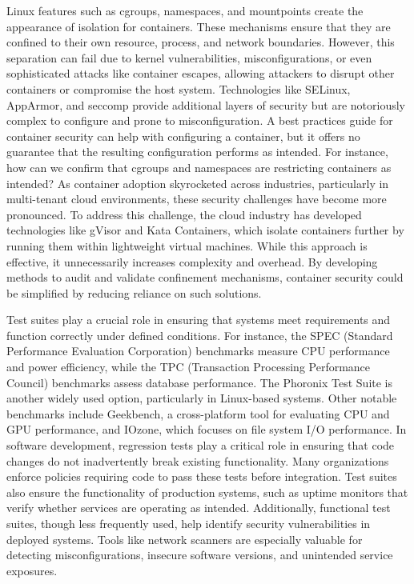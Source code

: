 Linux features such as cgroups, namespaces, and mountpoints create the appearance of isolation for containers. These mechanisms ensure that they are confined to their own resource, process, and network boundaries. However, this separation can fail due to kernel vulnerabilities, misconfigurations, or even sophisticated attacks like container escapes, allowing attackers to disrupt other containers or compromise the host system. Technologies like SELinux, AppArmor, and seccomp provide additional layers of security but are notoriously complex to configure and prone to misconfiguration. A best practices guide for container security  \cite{CIS} can help with configuring a container, but it offers no guarantee that the resulting configuration performs as intended. For instance, how can we confirm that cgroups and namespaces are restricting containers as intended? As container adoption skyrocketed across industries, particularly in multi-tenant cloud environments, these security challenges have become more pronounced. To address this challenge, the cloud industry has developed technologies like gVisor and Kata Containers, which isolate containers further by running them within lightweight virtual machines. While this approach is effective, it unnecessarily increases complexity and overhead. By developing methods to audit and validate confinement mechanisms, container security could be simplified by reducing reliance on such solutions.

Test suites play a crucial role in ensuring that systems meet requirements and function correctly under defined conditions. For instance, the SPEC (Standard Performance Evaluation Corporation) benchmarks measure CPU performance and power efficiency, while the TPC (Transaction Processing Performance Council) benchmarks assess database performance. The Phoronix Test Suite is another widely used option, particularly in Linux-based systems. Other notable benchmarks include Geekbench, a cross-platform tool for evaluating CPU and GPU performance, and IOzone, which focuses on file system I/O performance. In software development, regression tests play a critical role in ensuring that code changes do not inadvertently break existing functionality. Many organizations enforce policies requiring code to pass these tests before integration. Test suites also ensure the functionality of production systems, such as uptime monitors that verify whether services are operating as intended. Additionally, functional test suites, though less frequently used, help identify security vulnerabilities in deployed systems. Tools like network scanners are especially valuable for detecting misconfigurations, insecure software versions, and unintended service exposures.


